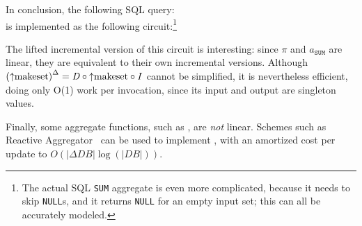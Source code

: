 In conclusion, the following SQL query: \\
is implemented as the following circuit:\footnote{The actual SQL \texttt{SUM} aggregate is
even more complicated, because it needs to skip \texttt{NULL}s,
and it returns \texttt{NULL} for an empty input set;
this can all be accurately modeled.}


The lifted incremental version of this circuit is interesting: since $\pi$
and $a_\texttt{SUM}$ are linear, they are equivalent to their own incremental
versions.  Although ${({\uparrow}\mbox{makeset})}^{\Delta} = \mathit{D} \circ {\uparrow}\mbox{makeset} \circ \mathit{I}$
cannot be simplified, it is nevertheless efficient, doing only O(1) work per
invocation, since its input and output are singleton values.


%

Finally, some aggregate functions, such as , are \emph{not}
linear.  Schemes such as Reactive Aggregator~\cite{tangwongsan-vldb15}
can be used to implement , with an amortized cost per update
to $O(|\Delta DB| \log(|DB|))$.

